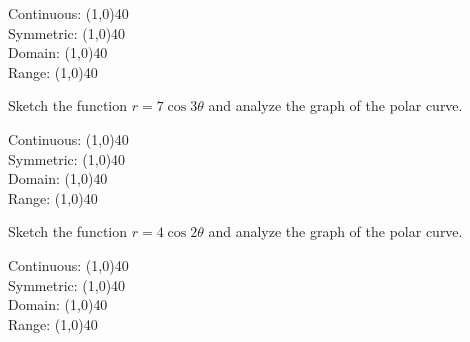 \documentclass[../main.tex]{subfiles}
\begin{document}
\begin{questions}
    Continuous: \line(1,0){40} \\
    \newline
    Symmetric: \line(1,0){40} \\
    \newline
    Domain: \line(1,0){40} \\
    \newline
    Range: \line(1,0){40} \\
    
    \question[1] Sketch the function $r = 7\cos3\theta$ and analyze the graph of the polar curve.
    
        \begin{left} 
        \end{left}
    
    Continuous: \line(1,0){40} \\
    \newline
    Symmetric: \line(1,0){40} \\
    \newline
    Domain: \line(1,0){40} \\
    \newline
    Range: \line(1,0){40} \\
    
    \newpage
    \question[1] Sketch the function $r = 4\cos2\theta$ and analyze the graph of the polar curve.
    
        \begin{left} 
        \end{left}
    
    Continuous: \line(1,0){40} \\
    \newline
    Symmetric: \line(1,0){40} \\
    \newline
    Domain: \line(1,0){40} \\
    \newline
    Range: \line(1,0){40} \\
    

\end{questions}
\end{document}
